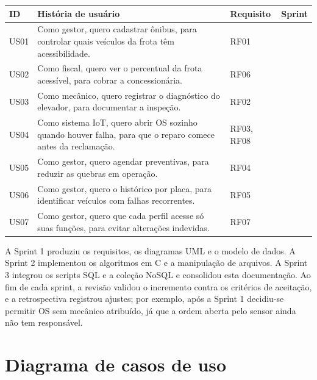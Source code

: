 \documentclass[12pt,a4paper,oneside]{report}
\newcommand{\fonte}[1]{\par\vspace{2pt}{\small Fonte: #1}\par}
\begin{document}
\begin{quadro}[H]
  \caption{Backlog priorizado e distribuição nas sprints}\label{qd:backlog}
  \small\singlespacing
  \renewcommand{\arraystretch}{1.25}
  \begin{tabularx}{\textwidth}{|>{\centering\arraybackslash}p{1.1cm}|X|>{\centering\arraybackslash}p{1.6cm}|>{\centering\arraybackslash}p{1.5cm}|}
    \hline
    \rowcolor{gray!15}\textbf{ID} & \textbf{História de usuário} & \textbf{Requisito} & \textbf{Sprint} \\ \hline
    US01 & Como gestor, quero cadastrar ônibus, para controlar quais veículos da frota têm acessibilidade. & RF01 & 1 \\ \hline
    US02 & Como fiscal, quero ver o percentual da frota acessível, para cobrar a concessionária. & RF06 & 1 \\ \hline
    US03 & Como mecânico, quero registrar o diagnóstico do elevador, para documentar a inspeção. & RF02 & 2 \\ \hline
    US04 & Como sistema IoT, quero abrir OS sozinho quando houver falha, para que o reparo comece antes da reclamação. & RF03, RF08 & 2 \\ \hline
    US05 & Como gestor, quero agendar preventivas, para reduzir as quebras em operação. & RF04 & 2 \\ \hline
    US06 & Como gestor, quero o histórico por placa, para identificar veículos com falhas recorrentes. & RF05 & 3 \\ \hline
    US07 & Como gestor, quero que cada perfil acesse só suas funções, para evitar alterações indevidas. & RF07 & 2 \\ \hline
  \end{tabularx}
  \fonte{Elaborado pelo autor (2026).}
\end{quadro}

A Sprint 1 produziu os requisitos, os diagramas UML e o modelo de dados. A Sprint 2 implementou os
algoritmos em C e a manipulação de arquivos. A Sprint 3 integrou os scripts SQL e a coleção NoSQL e
consolidou esta documentação. Ao fim de cada sprint, a revisão validou o incremento contra os critérios de
aceitação, e a retrospectiva registrou ajustes; por exemplo, após a Sprint 1 decidiu-se permitir OS sem mecânico
atribuído, já que a ordem aberta pelo sensor ainda não tem responsável.

\section{Diagrama de casos de uso}
\end{document}
